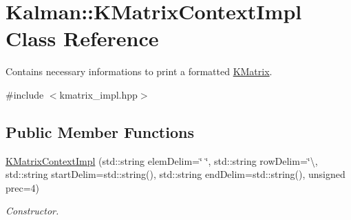 \hypertarget{classKalman_1_1KMatrixContextImpl}{}\section{Kalman\+:\+:K\+Matrix\+Context\+Impl Class Reference}
\label{classKalman_1_1KMatrixContextImpl}


Contains necessary informations to print a formatted {\ttfamily \mbox{\hyperlink{classKalman_1_1KMatrix}{K\+Matrix}}}.  




{\ttfamily \#include $<$kmatrix\+\_\+impl.\+hpp$>$}

\subsection*{Public Member Functions}
\begin{DoxyCompactItemize}
\item 
\mbox{\hyperlink{classKalman_1_1KMatrixContextImpl_adf1fa4ddf2cdac1fb694cf669f65c47b}{K\+Matrix\+Context\+Impl}} (std\+::string elem\+Delim=\char`\"{} \char`\"{}, std\+::string row\+Delim=\char`\"{}\textbackslash{}, std\+::string start\+Delim=std\+::string(), std\+::string end\+Delim=std\+::string(), unsigned prec=4)
\begin{DoxyCompactList}\small\item\em Constructor. \end{DoxyCompactList}\end{DoxyCompactItemize}
